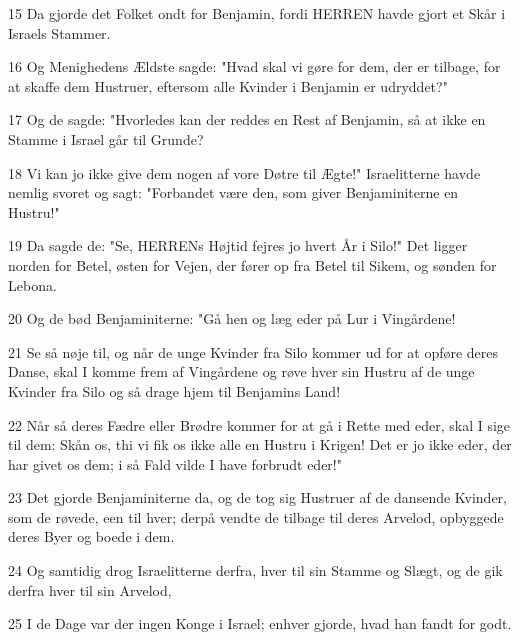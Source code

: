 \par 15 Da gjorde det Folket ondt for Benjamin, fordi HERREN havde gjort et Skår i Israels Stammer.
\par 16 Og Menighedens Ældste sagde: "Hvad skal vi gøre for dem, der er tilbage, for at skaffe dem Hustruer, eftersom alle Kvinder i Benjamin er udryddet?"
\par 17 Og de sagde: "Hvorledes kan der reddes en Rest af Benjamin, så at ikke en Stamme i Israel går til Grunde?
\par 18 Vi kan jo ikke give dem nogen af vore Døtre til Ægte!" Israelitterne havde nemlig svoret og sagt: "Forbandet være den, som giver Benjaminiterne en Hustru!"
\par 19 Da sagde de: "Se, HERRENs Højtid fejres jo hvert År i Silo!" Det ligger norden for Betel, østen for Vejen, der fører op fra Betel til Sikem, og sønden for Lebona.
\par 20 Og de bød Benjaminiterne: "Gå hen og læg eder på Lur i Vingårdene!
\par 21 Se så nøje til, og når de unge Kvinder fra Silo kommer ud for at opføre deres Danse, skal I komme frem af Vingårdene og røve hver sin Hustru af de unge Kvinder fra Silo og så drage hjem til Benjamins Land!
\par 22 Når så deres Fædre eller Brødre kommer for at gå i Rette med eder, skal I sige til dem: Skån os, thi vi fik os ikke alle en Hustru i Krigen! Det er jo ikke eder, der har givet os dem; i så Fald vilde I have forbrudt eder!"
\par 23 Det gjorde Benjaminiterne da, og de tog sig Hustruer af de dansende Kvinder, som de røvede, een til hver; derpå vendte de tilbage til deres Arvelod, opbyggede deres Byer og boede i dem.
\par 24 Og samtidig drog Israelitterne derfra, hver til sin Stamme og Slægt, og de gik derfra hver til sin Arvelod,
\par 25 I de Dage var der ingen Konge i Israel; enhver gjorde, hvad han fandt for godt.

